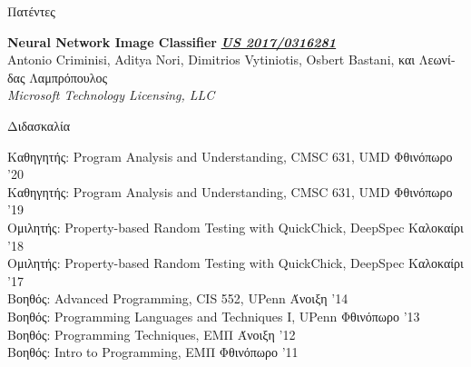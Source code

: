 \documentclass{resume} %
\begin{document}

\begin{rSection}{\textgreek{Πατέντες}}

{\bf Neural Network Image Classifier} \hfill {\href{https://patentimages.storage.googleapis.com/44/ec/9f/3f90c94a602fda/US20170316281A1.pdf}{\bf \em US 2017/0316281}}\\
Antonio Criminisi, Aditya Nori, Dimitrios Vytiniotis, Osbert Bastani, \textgreek{και} \textgreek{Λεωνίδας Λαμπρόπουλος}\\
{\em Microsoft Technology Licensing, LLC}

  
\end{rSection}


\newcommand{\teach}[3]{
  {#1: #2} \hfill #3 \\
  }

\begin{rSection}{\textgreek{Διδασκαλία}}

  \teach{\textgreek{Καθηγητής}}{Program Analysis and Understanding, CMSC 631, UMD}{\textgreek{Φθινόπωρο} '20}
  \teach{\textgreek{Καθηγητής}}{Program Analysis and Understanding, CMSC 631, UMD}{\textgreek{Φθινόπωρο} '19}
  \teach{\textgreek{Ομιλητής}}{Property-based Random Testing with QuickChick, DeepSpec}{\textgreek{Καλοκαίρι} '18}
  \teach{\textgreek{Ομιλητής}}{Property-based Random Testing with QuickChick, DeepSpec}{\textgreek{Καλοκαίρι} '17}  
  \teach{\textgreek{Βοηθός}}{Advanced Programming, CIS 552, UPenn}{\textgreek{Άνοιξη} '14}
  \teach{\textgreek{Βοηθός}}{Programming Languages and Techniques I, UPenn}{\textgreek{Φθινόπωρο} '13}
  \teach{\textgreek{Βοηθός}}{Programming Techniques, \textgreek{ΕΜΠ}}{\textgreek{Άνοιξη} '12}
  \teach{\textgreek{Βοηθός}}{Intro to Programming, \textgreek{ΕΜΠ}}{\textgreek{Φθινόπωρο} '11}
\end{rSection}



\newcommand{\talk}[3]{
  {\bf #1} \\ %
  {#3}
  }
\end{document}

